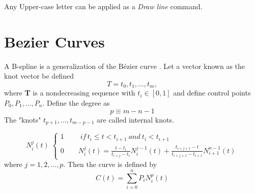 \documentclass[b5paper,twoside,11pt]{article}
\begin{document}
Any Upper-case letter can be applied as a \textit{Draw line} command.
\section{Bezier Curves}
A B-spline is a generalization of the Bézier curve \cite{BSpline}. Let a vector known as the knot vector be defined 
\begin{equation}
T={t_0,t_1,\ldots,t_m},
\end{equation}
where \textbf{T} is a nondecreasing sequence with $t_i\in[0,1]$ and define control points \textbf{$P_0,P_1,\ldots,P_n$}. Define the degree as
\begin{equation}
p\equiv m-n-1
\end{equation}
The "knots" $t_{p+1},\ldots,t_{m-p-1}$ are called internal knots.


\begin{equation} N_{i}^{j}(t)\;
\begin{cases} 1\qquad \;if \, t_i\leq t< t_{i+1}\:and\: t_i<t_{i+1} \\ 
0 \qquad   N_{i}^{j}(t)=\frac{t-t_i}{t_{i+j}-t_i} N_{i}^{j-1}(t) + \frac{t_{i+j+1} - t}{t_{i+j+1} - t_{i+1}} N_{i+1}^{n-1}(t)
 \end{cases}
  \end{equation}
  where $j=1,2,\ldots,p$. Then the curve is defined by
  \begin{equation}
  C(t)=\sum\limits_{i=0}^n P_i N_{i}^{p}(t)
  \end{equation}
\end{document}
